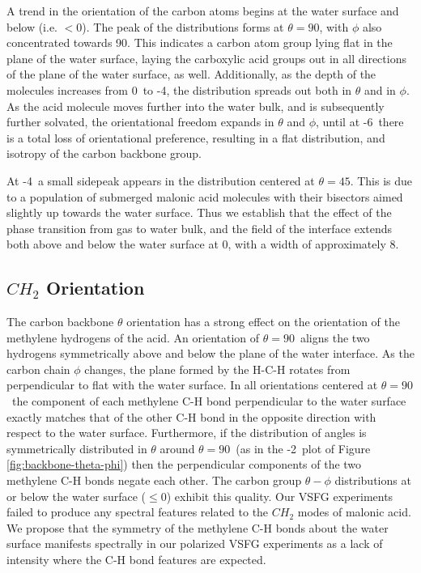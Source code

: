 A trend in the orientation of the carbon atoms begins at the water surface and below (i.e. $<0$\angs). The peak of the distributions forms at $\theta=90$\textdegree, with $\phi$ also concentrated towards 90\textdegree. This indicates a carbon atom group lying flat in the plane of the water surface, laying the carboxylic acid groups out in all directions of the plane of the water surface, as well. Additionally, as the depth of the molecules increases from 0\angs~to -4\angs, the distribution spreads out both in $\theta$ and in $\phi$. As the acid molecule moves further into the water bulk, and is subsequently further solvated, the orientational freedom expands in $\theta$ and $\phi$, until at -6\angs~there is a total loss of orientational preference, resulting in a flat distribution, and isotropy of the carbon backbone group.

At -4\angs~a small sidepeak appears in the distribution centered at $\theta=45$\textdegree. This is due to a population of submerged malonic acid molecules with their bisectors aimed slightly up towards the water surface. Thus we establish that the effect of the phase transition from gas to water bulk, and the field of the interface extends both above and below the water surface at 0\angs, with a width of approximately 8\angs.



\subsection {$CH_2$ Orientation}

The carbon backbone $\theta$ orientation has a strong effect on the orientation of the methylene hydrogens of the acid. An orientation of $\theta=90$\textdegree~aligns the two hydrogens symmetrically above and below the plane of the water interface. As the carbon chain $\phi$ changes, the plane formed by the H-C-H rotates from perpendicular to flat with the water surface. In all orientations centered at $\theta=90$\textdegree~the component of each methylene C-H bond perpendicular to the water surface exactly matches that of the other C-H bond in the opposite direction with respect to the water surface. Furthermore, if the distribution of angles is symmetrically distributed in $\theta$ around $\theta=90$\textdegree~(as in the -2\angs~plot of Figure \ref{fig:backbone-theta-phi}) then the perpendicular components of the two methylene C-H bonds negate each other. The carbon group $\theta-\phi$ distributions at or below the water surface ($\le 0$\angs) exhibit this quality. Our VSFG experiments failed to produce any spectral features related to the $CH_2$ modes of malonic acid. We propose that the symmetry of the methylene C-H bonds about the water surface manifests spectrally in our polarized VSFG experiments as a lack of intensity where the C-H bond features are expected. 

